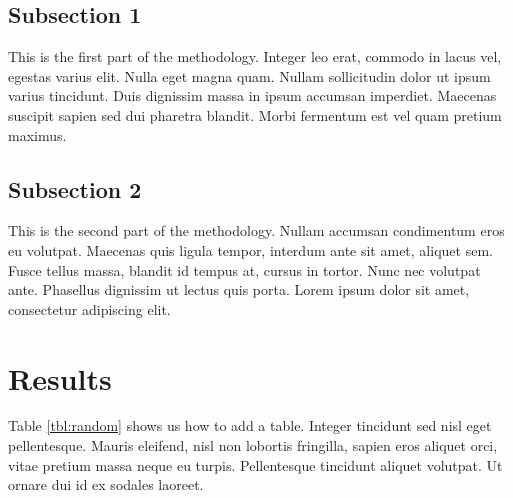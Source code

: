 \documentclass[12pt,a4paper,]{report}
\begin{document}
\hypertarget{subsection-1-1}{%
\subsection{Subsection 1}\label{subsection-1-1}}

This is the first part of the methodology. Integer leo erat, commodo in
lacus vel, egestas varius elit. Nulla eget magna quam. Nullam
sollicitudin dolor ut ipsum varius tincidunt. Duis dignissim massa in
ipsum accumsan imperdiet. Maecenas suscipit sapien sed dui pharetra
blandit. Morbi fermentum est vel quam pretium maximus.

\hypertarget{subsection-2-2}{%
\subsection{Subsection 2}\label{subsection-2-2}}

This is the second part of the methodology. Nullam accumsan condimentum
eros eu volutpat. Maecenas quis ligula tempor, interdum ante sit amet,
aliquet sem. Fusce tellus massa, blandit id tempus at, cursus in tortor.
Nunc nec volutpat ante. Phasellus dignissim ut lectus quis porta. Lorem
ipsum dolor sit amet, consectetur adipiscing elit.

\hypertarget{results-2}{%
\section{Results}\label{results-2}}

Table \ref{tbl:random} shows us how to add a table. Integer tincidunt
sed nisl eget pellentesque. Mauris eleifend, nisl non lobortis
fringilla, sapien eros aliquet orci, vitae pretium massa neque eu
turpis. Pellentesque tincidunt aliquet volutpat. Ut ornare dui id ex
sodales laoreet.

\newpage
\end{document}
